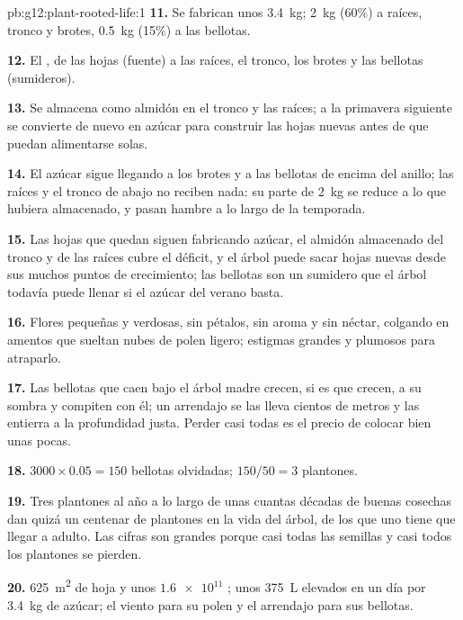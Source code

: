 \begin{solution}{pb:g12:plant-rooted-life:1}
\textbf{11.} Se fabrican unos \qty{3.4}{kg}; \qty{2}{kg} (60\%) a
raíces, tronco y brotes, \qty{0.5}{kg} (15\%) a las bellotas.

\textbf{12.} El , de las hojas (fuente) a las raíces, el tronco,
los brotes y las bellotas (sumideros).

\textbf{13.} Se almacena como almidón en el tronco y las raíces; a la
primavera siguiente se convierte de nuevo en azúcar para construir las
hojas nuevas antes de que puedan alimentarse solas.

\textbf{14.} El azúcar sigue llegando a los brotes y a las bellotas de
encima del anillo; las raíces y el tronco de abajo no reciben nada: su
parte de \qty{2}{kg} se reduce a lo que hubiera almacenado, y pasan
hambre a lo largo de la temporada.

\textbf{15.} Las hojas que quedan siguen fabricando azúcar, el almidón
almacenado del tronco y de las raíces cubre el déficit, y el árbol
puede sacar hojas nuevas desde sus muchos puntos de crecimiento; las
bellotas son un sumidero que el árbol todavía puede llenar si el azúcar
del verano basta.

\textbf{16.} Flores pequeñas y verdosas, sin pétalos, sin aroma y sin
néctar, colgando en amentos que sueltan nubes de polen ligero; estigmas
grandes y plumosos para atraparlo.

\textbf{17.} Las bellotas que caen bajo el árbol madre crecen, si es
que crecen, a su sombra y compiten con él; un arrendajo se las lleva
cientos de metros y las entierra a la profundidad justa. Perder casi
todas es el precio de colocar bien unas pocas.

\textbf{18.} $3000 \times 0.05 = 150$ bellotas olvidadas; $150/50 = 3$
plantones.

\textbf{19.} Tres plantones al año a lo largo de unas cuantas décadas
de buenas cosechas dan quizá un centenar de plantones en la vida del
árbol, de los que uno tiene que llegar a adulto. Las cifras son grandes
porque casi todas las semillas y casi todos los plantones se pierden.

\textbf{20.} \qty{625}{m^2} de hoja y unos $\num{1.6e11}$ ; unos
\qty{375}{L} elevados en un día por \qty{3.4}{kg} de azúcar; el viento
para su polen y el arrendajo para sus bellotas.
\end{solution}
